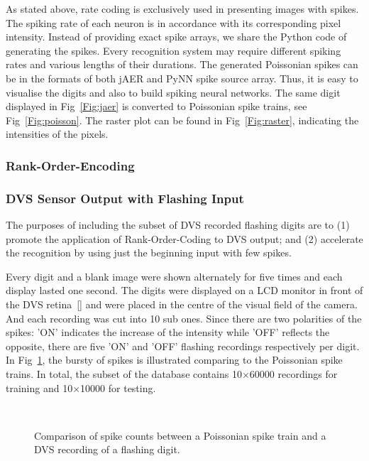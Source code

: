 	As stated above, rate coding is exclusively used in presenting images with spikes.
	The spiking rate of each neuron is in accordance with its corresponding pixel intensity.
	Instead of providing exact spike arrays, we share the Python code of generating the spikes.
	Every recognition system may require different spiking rates and various lengths of their durations.
	The generated Poissonian spikes can be in the formats of both jAER and PyNN spike source array.
	Thus, it is easy to visualise the digits and also to build spiking neural networks.
	The same digit displayed in Fig~\ref{Fig:jaer} is converted to Poissonian spike trains, see Fig~\ref{Fig:poisson}.
	The raster plot can be found in Fig~\ref{Fig:raster}, indicating the intensities of the pixels.

	
	\subsubsection{Rank-Order-Encoding}
  
	\subsubsection{DVS Sensor Output with Flashing Input}
	The purposes of including the subset of DVS recorded flashing digits are to (1) promote the application of Rank-Order-Coding to DVS output; and (2) accelerate the recognition by using just the beginning input with few spikes.
	
	Every digit and a blank image were shown alternately for five times and each display lasted one second.
	The digits were displayed on a LCD monitor in front of the DVS retina~[\cite{serrano-gotarredona_128_2013}] and were placed in the centre of the visual field of the camera.
	And each recording was cut into 10 sub ones.
	Since there are two polarities of the spikes: 'ON' indicates the increase of the intensity while 'OFF' reflects the opposite, there are five 'ON' and 'OFF' flashing recordings respectively per digit.
	In Fig~\ref{fig:count}, the bursty of spikes is illustrated comparing to the Poissonian spike trains.
	In total, the subset of the database contains 10$\times$60000 recordings for training and 10$\times$10000 for testing.
	\begin{figure}[b!]
	  \centering
	  \\

	  \caption{Comparison of spike counts between a Poissonian spike train and a DVS recording of a flashing digit.}
	  \label{fig:count}
	\end{figure}
